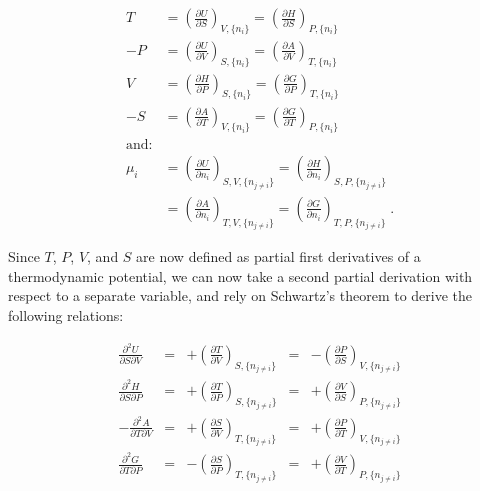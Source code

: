 \documentclass[
  9pt,
]{extbook}
\theoremstyle{definition}
\theoremstyle{definition}
\theoremstyle{definition}
\theoremstyle{definition}
\theoremstyle{remark}
\begin{document}
\begin{equation}
\begin{aligned}
 T &= \left(\frac{\partial U}{\partial S} \right)_{V,\{n_i\}} = \left(\frac{\partial H}{\partial S} \right)_{P,\{n_i\}}  \\
-P &= \left(\frac{\partial U}{\partial V} \right)_{S,\{n_i\}} = \left(\frac{\partial A}{\partial V} \right)_{T,\{n_i\}}  \\
 V &= \left(\frac{\partial H}{\partial P} \right)_{S,\{n_i\}} = \left(\frac{\partial G}{\partial P} \right)_{T,\{n_i\}}  \\
-S &= \left(\frac{\partial A}{\partial T} \right)_{V,\{n_i\}} = \left(\frac{\partial G}{\partial T} \right)_{P,\{n_i\}}  \\
\text{and:}
\\
 \mu_i &=  \left(\frac{\partial U}{\partial n_i} \right)_{S,V,\{n_{j \neq i}\}} =  \left(\frac{\partial H}{\partial n_i} \right)_{S,P,\{n_{j \neq i}\}} \\
       &= \left(\frac{\partial A}{\partial n_i} \right)_{T,V,\{n_{j \neq i}\}} = \left(\frac{\partial G}{\partial n_i} \right)_{T,P,\{n_{j \neq i}\}}\;.
\end{aligned}
\label{eq:dhagchem3}
\end{equation}

Since \(T\), \(P\), \(V\), and \(S\) are now defined as partial first derivatives of a thermodynamic potential, we can now take a second partial derivation with respect to a separate variable, and rely on Schwartz's theorem to derive the following relations:

\begin{equation}
\begin{aligned}
\frac{\partial^2 U }{\partial S \partial V} &=& +\left(\frac{\partial T}{\partial V}\right)_{S,\{n_{j \neq i}\}} &=& -\left(\frac{\partial P}{\partial S}\right)_{V,\{n_{j \neq i}\}}   \\
\frac{\partial^2 H }{\partial S \partial P} &=& +\left(\frac{\partial T}{\partial P}\right)_{S,\{n_{j \neq i}\}} &=& +\left(\frac{\partial V}{\partial S}\right)_{P,\{n_{j \neq i}\}}  \\
-\frac{\partial^2 A }{\partial T \partial V} &=& +\left(\frac{\partial S}{\partial V}\right)_{T,\{n_{j \neq i}\}} &=& +\left(\frac{\partial P}{\partial T}\right)_{V,\{n_{j \neq i}\}}  \\
\frac{\partial^2 G }{\partial T \partial P} &=& -\left(\frac{\partial S}{\partial P}\right)_{T,\{n_{j \neq i}\}} &=& +\left(\frac{\partial V}{\partial T}\right)_{P,\{n_{j \neq i}\}}
\end{aligned}
\label{eq:maxrelf}
\end{equation}
\end{document}
